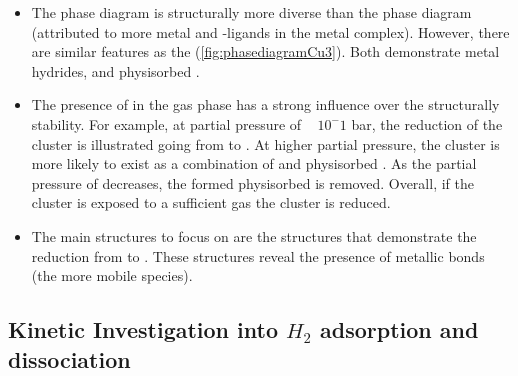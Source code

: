 \documentclass[journal=jctcce,manuscript=article]{achemso}
\begin{document}
\begin{itemize}
    \item The  phase diagram is structurally more diverse than the  phase diagram (attributed to more metal and -ligands in the  metal complex). However, there are similar features as the (\ref{fig:phasediagramCu3}). Both demonstrate metal hydrides, and physisorbed .
    \item The presence of  in the gas phase has a strong influence over the structurally stability. For example, at  partial pressure of ~ $10^-1$ bar, the reduction of the cluster is illustrated going from  to . At higher  partial pressure, the cluster is more likely to exist as a combination of  and physisorbed . As the partial pressure of  decreases, the formed physisorbed  is removed. Overall, if the cluster is exposed to a sufficient  gas the cluster is reduced. 
    \item The main structures to focus on are the structures that demonstrate the  reduction from  to . These structures reveal the presence of metallic  bonds (the more mobile species).
\end{itemize}

\subsection{Kinetic Investigation into $H_{2}$ adsorption and dissociation}

\newpage
\end{document}
